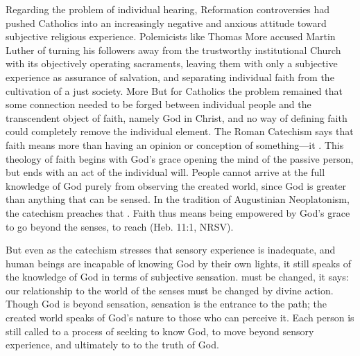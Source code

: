 Regarding the problem of individual hearing, Reformation controversies had pushed Catholics into an increasingly negative and anxious attitude toward subjective religious experience.
Polemicists like Thomas More accused Martin Luther of turning his followers away from the trustworthy institutional Church with its objectively operating sacraments, leaving them with only a subjective experience as assurance of salvation, and separating individual faith from the cultivation of a just society.
\Autocite[ch. 4; @Schreiner:Certainty]{Catholic:Catechismus1614}
% 
More 
But for Catholics the problem remained that some connection needed to be forged between individual people and the transcendent object of faith, namely God in Christ, and no way of defining faith could completely remove the individual element.
The Roman Catechism says that faith means more than having an opinion or conception of something---it .
\Autocite[15:  .]{Catholic:Catechismus1614}
This theology of faith begins with God's grace opening the mind of the passive person, but ends with an act of the individual will.
People cannot arrive at the full knowledge of God purely from observing the created world, since God is greater than anything that can be sensed.
In the tradition of Augustinian Neoplatonism, the catechism preaches that .
\Autocite[18:  .]{Catholic:Catechismus1614}
Faith thus means being empowered by God's grace to go beyond the senses, to reach  (Heb. 11:1, NRSV).

But even as the catechism stresses that sensory experience is inadequate, and human beings are incapable of knowing God by their own lights, it still speaks of the knowledge of God in terms of subjective sensation.
 must be changed, it says: our relationship to the world of the senses must be changed by divine action.
Though God is beyond sensation, sensation is the entrance to the path; the created world speaks of God's nature to those who can perceive it.
Each person is still called to a process of seeking to know God, to move beyond sensory experience, and ultimately to  to the truth of God.

